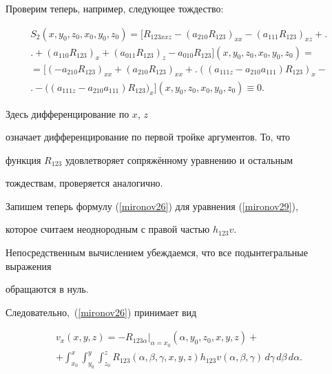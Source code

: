 Проверим теперь, например, следующее тождество:


\begin{multline*}


S_{2}(x,y_{0}, z_{0}, x_{0}, y_{0}, z_{0})=


\bigl[R_{123xxz}-(a_{210}R_{123})_{xx}-(a_{111}R_{123})_{xz}+\bigr.


\\ \bigl.+(a_{110}R_{123})_{x}


+(a_{011}R_{123})_{z}-a_{010}R_{123}\bigr](x,y_{0}, z_{0}, x_{0}, y_{0}, z_{0})=


\\=


\bigl[(-a_{210}R_{123})_{xx}+(a_{210}R_{123})_{xx}+\bigr.


((a_{111z} -a_{210}a_{111})R_{123})_{x}-\\\bigl.


-


\bigl((a_{111z}-a_{210}a_{111})R_{123}\bigr)_{x}\bigr](x,y_{0}, z_{0}, x_{0}, y_{0}, z_{0})


\equiv 0.


\end{multline*}


Здесь дифференцирование по $x$, $z$


означает дифференцирование по первой тройке аргументов. То, что


функция $R_{123}$ удовлетворяет сопряжённому уравнению и остальным


тождествам, проверяется аналогично.





Запишем теперь формулу (\ref{mironov26}) для уравнения (\ref{mironov29}),


которое считаем неоднородным с правой частью $h_{123}v$.


Непосредственным вычислением убеждаемся, что все подынтегральные выражения


обращаются в нуль.


Следовательно,~(\ref{mironov26}) принимает вид


\begin{multline}\label{mironov31}


v_{x}(x, y, z)=-R_{123\alpha}\Big|_{\alpha=x_0} (\alpha,y_{0}, z_{0}, x, y, z) +\\


+\int_{x_{0}}^{x}\int_{y_{0}}^{y}\int_{z_{0}}^{z} R_{123}(\alpha,\beta,\gamma,x, y, z) h_{123}v(\alpha,\beta,\gamma)


\,d\gamma \,d\beta \,d\alpha.


\end{multline}


